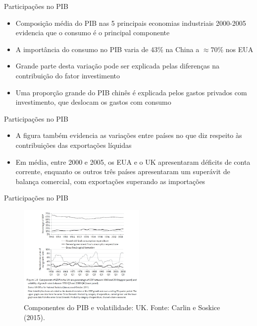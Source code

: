 \documentclass[10pt]{beamer}
\begin{document}
\begin{frame}{Participações no PIB}
    \begin{itemize}
        \item Composição média do PIB nas 5 principais economias industriais 2000-2005 evidencia que o consumo é o principal componente\bigskip
         
        \item A importância do consumo no PIB varia de 43\% na China a  $\approx 70\%$ nos EUA\bigskip
         
        \item Grande parte desta variação pode ser explicada pelas diferenças na contribuição do fator investimento\bigskip
         
        \item Uma proporção grande do PIB chinês é explicada pelos gastos privados com investimento, que deslocam os gastos com consumo
    \end{itemize}
\end{frame}

\begin{frame}{Participações no PIB}
    \begin{itemize}
        \item A figura também evidencia as variações entre países no que diz respeito às contribuições das exportações líquidas\bigskip
         
        \item Em média, entre 2000 e 2005, os EUA e o UK apresentaram déficits de conta corrente, enquanto os outros três países apresentaram um superávit de balança comercial, com exportações superando as importações
    \end{itemize}
\end{frame}

\begin{frame}{Participações no PIB}
    \begin{figure}
        \centering
        \includegraphics[width=0.55\textwidth]{./figures/aula5_fig3.PNG}
        \caption{Componentes do PIB e volatilidade: UK. Fonte: Carlin e Soskice (2015).}
        \label{aula5_fig3}
    \end{figure}
\end{frame}
\end{document}
